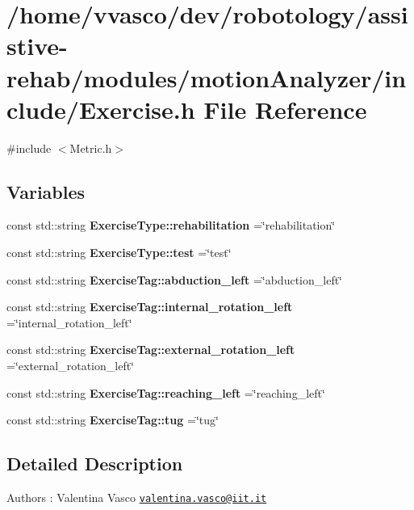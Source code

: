 \section{/home/vvasco/dev/robotology/assistive-\/rehab/modules/motion\+Analyzer/include/\+Exercise.h File Reference}
\label{Exercise_8h}
{\ttfamily \#include $<$Metric.\+h$>$}\newline
\subsection*{Variables}
\begin{DoxyCompactItemize}
\item 
\mbox{\label{Exercise_8h_ad3d299b4cbdcf9590a34383c9769552b}} 
const std\+::string {\bfseries Exercise\+Type\+::rehabilitation} =\char`\"{}rehabilitation\char`\"{}
\item 
\mbox{\label{Exercise_8h_a1b9417d7d699f4c9615ac6ca865c2b24}} 
const std\+::string {\bfseries Exercise\+Type\+::test} =\char`\"{}test\char`\"{}
\item 
\mbox{\label{Exercise_8h_a677cff5d00b858887bfc87459677f4c3}} 
const std\+::string {\bfseries Exercise\+Tag\+::abduction\+\_\+left} =\char`\"{}abduction\+\_\+left\char`\"{}
\item 
\mbox{\label{Exercise_8h_aa57cd043979311c1e1dfb6fe25c311e9}} 
const std\+::string {\bfseries Exercise\+Tag\+::internal\+\_\+rotation\+\_\+left} =\char`\"{}internal\+\_\+rotation\+\_\+left\char`\"{}
\item 
\mbox{\label{Exercise_8h_a85804e87dc5e4ce068563687f55eebe6}} 
const std\+::string {\bfseries Exercise\+Tag\+::external\+\_\+rotation\+\_\+left} =\char`\"{}external\+\_\+rotation\+\_\+left\char`\"{}
\item 
\mbox{\label{Exercise_8h_ae4590339042bcaf138b615ef43fd4ce0}} 
const std\+::string {\bfseries Exercise\+Tag\+::reaching\+\_\+left} =\char`\"{}reaching\+\_\+left\char`\"{}
\item 
\mbox{\label{Exercise_8h_a340ab8f95503666972bfff376c1f6627}} 
const std\+::string {\bfseries Exercise\+Tag\+::tug} =\char`\"{}tug\char`\"{}
\end{DoxyCompactItemize}


\subsection{Detailed Description}
\begin{DoxyAuthor}{Authors}
\+: Valentina Vasco \href{mailto:valentina.vasco@iit.it}{\tt valentina.\+vasco@iit.\+it} 
\end{DoxyAuthor}
